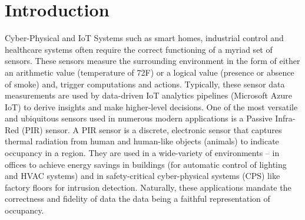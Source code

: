 \section{Introduction}
\label{sec:intro}

Cyber-Physical and IoT Systems such as smart homes, industrial control and healthcare systems often require the correct functioning of a myriad set of sensors. 
%
%
These sensors measure the surrounding environment in the form of either an arithmetic value (\eg temperature of 72\degree F) or a logical value (\eg presence or absence of smoke) and, trigger computations and actions.
% 
Typically, these sensor data measurements are used by data-driven IoT analytics pipelines (\eg Microsoft Azure IoT) to derive insights and make higher-level decisions. 
%
%
One of the most versatile and ubiquitous sensors used in numerous modern applications is a Passive Infra-Red (PIR) sensor.
%
A PIR sensor is a discrete, electronic sensor that captures thermal radiation from human and human-like objects (\eg animals) to indicate occupancy in a region. %
%
They are used in a wide-variety of environments -- \eg in offices to achieve energy savings in buildings (for automatic control of lighting and HVAC systems) and in safety-critical cyber-physical systems (CPS) like factory floors for intrusion detection.
%
Naturally, these applications mandate the correctness and fidelity of data \ie the data being a faithful representation of occupancy.
%
%

